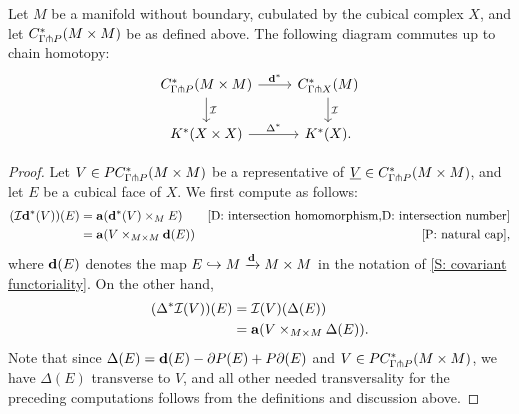 \documentclass{amsart}
\begin{document}
\begin{proposition}\label{P: diag/intersect}
	Let $M$ be a manifold without boundary, cubulated by the cubical complex $X$, and let $C^*_{\Gamma \pitchfork P}(M \times M)$ be as defined above.
	The following diagram commutes up to chain homotopy:
	\[
	\begin{tikzcd}
	C^*_{\Gamma \pf P}(M \times M) \arrow[r,"\diag^*"] \arrow[d,"\mc I"]& C^*_{\Gamma \pf X}(M) \arrow[d,"\mc I"]  \\
	 \arrow[r,"\Delta^*"] K^*(X\times X)&K^*(X).
	\end{tikzcd}
	\]
\end{proposition}
\begin{proof}
	Let $V \in PC^*_{\Gamma \pitchfork P}(M \times M)$ be a representative of $\underline{V} \in C^*_{\Gamma \pitchfork P}(M \times M)$, and let $E$ be a cubical face of $X$.
	We first compute as follows:
	\begin{align*}
		(\mc I \diag^*(V))(E) & = \aug(\diag^*(V) \times_M  E) &\text{\cref{D: intersection homomorphism,D: intersection number}}\\
		&=\aug(V \times_{M \times M} \diag(E)) &\text{\cref{P: natural cap}},
	\end{align*}
	where $\mathbf{d}(E)$ denotes the map $E \hookrightarrow M \xrightarrow{\mathbf{d}} M \times M$ in the notation of \cref{S: covariant functoriality}.
	On the other hand,
		\begin{align*}
		(\Delta^*\mathcal{I}(V))(E) & = \mathcal{I}(V)(\Delta (E))\\
		&=\mathbf{a}(V \times_{M \times M} \Delta (E)).
	\end{align*}
	Note that since $\Delta (E) = \mathbf{d}(E) - \partial P(E) + P \partial(E)$ and $V \in PC^*_{\Gamma \pitchfork P}(M \times M)$, we have $\Delta(E)$ transverse to $V$, and all other needed transversality for the preceding computations follows from the definitions and discussion above.


\end{proof}
\end{document}
